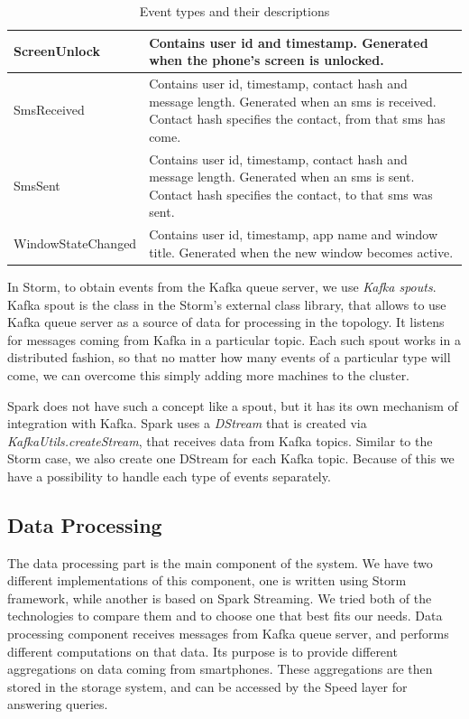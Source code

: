 \begin{table}[h]
\begin{tabular}{ | l | p{10cm} |}
    ScreenUnlock & Contains user id and timestamp. Generated when the phone's screen is unlocked. \\ \hline
    SmsReceived & Contains user id,  timestamp, contact hash and message length. Generated when an sms is received. Contact hash specifies the contact, from that sms has come. \\ \hline
    SmsSent & Contains user id,  timestamp, contact hash and message length. Generated when an sms is sent. Contact hash specifies the contact, to that sms was sent. \\ \hline
    WindowStateChanged & Contains user id, timestamp, app name and window title. Generated when the new window becomes active. \\
    \hline
\end{tabular}
\caption{Event types and their descriptions}
\label{table:event_types}
\end{table}

In Storm, to obtain events from the Kafka queue server, we use \textit{Kafka spouts}.
Kafka spout is the class in the Storm's external class library, that allows to use Kafka queue server as a source of data for processing in the topology.
It listens for messages coming from Kafka in a particular topic.
Each such spout works in a distributed fashion, so that no matter how many events of a particular type will come, we can overcome this simply adding more machines to the cluster.

Spark does not have such a concept like a spout, but it has its own mechanism of integration with Kafka.
Spark uses a \textit{DStream} that is created via \textit{KafkaUtils.createStream}, that receives data from Kafka topics.
Similar to the Storm case, we also create one DStream for each Kafka topic.
Because of this we have a possibility to handle each type of events separately.

\subsection{Data Processing}

The data processing part is the main component of the system.
We have two different implementations of this component, one is written using Storm framework, while another is based on Spark Streaming.
We tried both of the technologies to compare them and to choose one that best fits our needs.
Data processing component receives messages from Kafka queue server, and performs different computations on that data.
Its purpose is to provide different aggregations on data coming from smartphones.
These aggregations are then stored in the storage system, and can be accessed by the Speed layer for answering queries.

